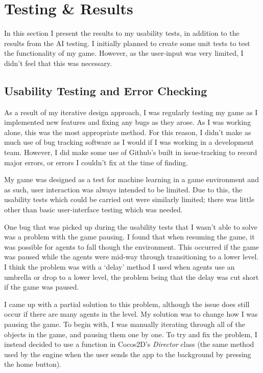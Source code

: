 \documentclass[a4paper,oneside]{report}
\begin{document}
\chapter{Testing \& Results}

In this section I present the results to my usability tests, in addition to the results from the AI testing. I initially planned to create some unit tests to test the functionality of my game. However, as the user-input was very limited, I didn't feel that this was necessary.

\section{Usability Testing and Error Checking}

As a result of my iterative design approach, I was regularly testing my game as I implemented new features and fixing any bugs as they arose. As I was working alone, this was the most appropriate method. For this reason, I didn't make as much use of bug tracking software as I would if I was working in a development team. However, I did make some use of Github's built in issue-tracking to record major errors, or errors I couldn't fix at the time of finding.

My game was designed as a test for machine learning in a game environment and as such, user interaction was always intended to be limited. Due to this, the usability tests which could be carried out were similarly limited; there was little other than basic user-interface testing which was needed.

One bug that was picked up during the usability tests that I wasn't able to solve was a problem with the game pausing. I found that when resuming the game, it was possible for agents to fall though the environment. This occurred if the game was paused while the agents were mid-way through transitioning to a lower level. I think the problem was with a `delay' method I used when agents use an umbrella or drop to a lower level, the problem being that the delay was cut short if the game was paused.

I came up with a partial solution to this problem, although the issue does still occur if there are many agents in the level. My solution was to change how I was pausing the game. To begin with, I was manually iterating through all of the objects in the game, and pausing them one by one. To try and fix the problem, I instead decided to use a function in Cocos2D's \emph{Director} class (the same method used by the engine when the user sends the app to the background by pressing the home button).
\end{document}
